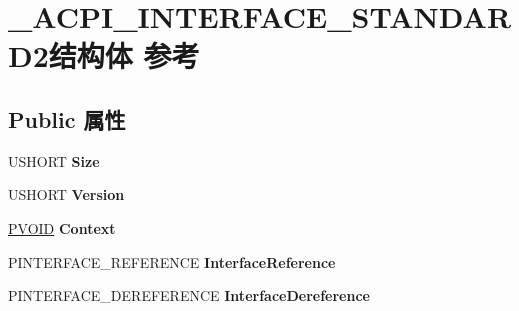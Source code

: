 \hypertarget{struct___a_c_p_i___i_n_t_e_r_f_a_c_e___s_t_a_n_d_a_r_d2}{}\section{\+\_\+\+A\+C\+P\+I\+\_\+\+I\+N\+T\+E\+R\+F\+A\+C\+E\+\_\+\+S\+T\+A\+N\+D\+A\+R\+D2结构体 参考}
\label{struct___a_c_p_i___i_n_t_e_r_f_a_c_e___s_t_a_n_d_a_r_d2}
\subsection*{Public 属性}
\begin{DoxyCompactItemize}
\item 
\mbox{\label{struct___a_c_p_i___i_n_t_e_r_f_a_c_e___s_t_a_n_d_a_r_d2_a0390574ede2fc60028c3b7ea395aa7a0}} 
U\+S\+H\+O\+RT {\bfseries Size}
\item 
\mbox{\label{struct___a_c_p_i___i_n_t_e_r_f_a_c_e___s_t_a_n_d_a_r_d2_a506c5b33d04c234ebf2092906b9f66fd}} 
U\+S\+H\+O\+RT {\bfseries Version}
\item 
\mbox{\label{struct___a_c_p_i___i_n_t_e_r_f_a_c_e___s_t_a_n_d_a_r_d2_a780d14c3cabc7cc9c385b068a09609c6}} 
\hyperlink{interfacevoid}{P\+V\+O\+ID} {\bfseries Context}
\item 
\mbox{\label{struct___a_c_p_i___i_n_t_e_r_f_a_c_e___s_t_a_n_d_a_r_d2_aab28147790cfcda8173bc4d28f3368c2}} 
P\+I\+N\+T\+E\+R\+F\+A\+C\+E\+\_\+\+R\+E\+F\+E\+R\+E\+N\+CE {\bfseries Interface\+Reference}
\item 
\mbox{\label{struct___a_c_p_i___i_n_t_e_r_f_a_c_e___s_t_a_n_d_a_r_d2_a159058527d0f5649dbb741ed027ba9f6}} 
P\+I\+N\+T\+E\+R\+F\+A\+C\+E\+\_\+\+D\+E\+R\+E\+F\+E\+R\+E\+N\+CE {\bfseries Interface\+Dereference}
\item 
\mbox{\label{struct___a_c_p_i___i_n_t_e_r_f_a_c_e___s_t_a_n_d_a_r_d2_a49f60239062c0df2813269bf7c82407b}} 

\end{DoxyCompactItemize}
